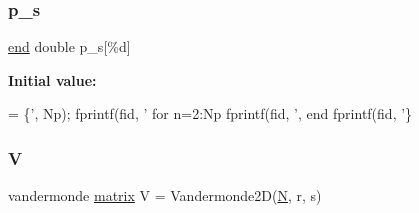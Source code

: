 \subsubsection{\texorpdfstring{p\+\_\+s}{p\_s}}
{\footnotesize\ttfamily \hyperlink{a00608_afb358f48b1646c750fb9da6c6585be2b}{end} double p\+\_\+s\mbox{[}\%d\mbox{]}}

{\bfseries Initial value\+:}
\begin{DoxyCode}
= \{\textcolor{stringliteral}{', Np);}
\textcolor{stringliteral}{fprintf(fid, '}%
\textcolor{stringliteral}{for n=2:Np}
\textcolor{stringliteral}{ fprintf(fid, '}, %
\textcolor{stringliteral}{end}
\textcolor{stringliteral}{fprintf(fid, '}\}
\end{DoxyCode}
\mbox{\label{a00575_af658e24e5ad7935911c432c5c02d895c}} 
\subsubsection{\texorpdfstring{V}{V}}
{\footnotesize\ttfamily vandermonde \hyperlink{a01014_af07ff1035f34d77764ff516f110e6832}{matrix} V = Vandermonde2D(\hyperlink{a00473_a5b9c4563028063ee53b517cce9aa701b}{N}, r, s)}

